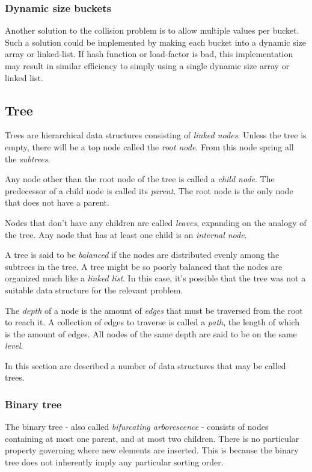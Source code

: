 \documentclass{article}
\begin{document}
\subsubsection{Dynamic size buckets}
Another solution to the collision problem is to allow multiple values per bucket. Such a solution could be
implemented by making each bucket into a dynamic size array or linked-list. If hash function or load-factor is bad,
this implementation may result in similar efficiency to simply using a single dynamic size array or linked list.


\newpage


\subsection{Tree}
Trees are hierarchical data structures consisting of {\em linked nodes}.
Unless the tree is empty, there will be a top node called the {\em root node}.
From this node spring all the {\em subtrees}.

Any node other than the root node of the tree is called a {\em child node}.
The predecessor of a child node is called its {\em parent}.
The root node is the only node that does not have a parent.

Nodes that don't have any children are called {\em leaves}, expanding on the analogy of the tree.
Any node that has at least one child is an {\em internal node}.

A tree is said to be {\em balanced} if the nodes are distributed evenly among the subtrees in the tree.
A tree might be so poorly balanced that the nodes are organized much like a {\em linked list}.
In this case, it's possible that the tree was not a suitable data structure for the relevant problem.

The {\em depth} of a node is the amount of {\em edges} that must be traversed from the root to reach it.
A collection of edges to traverse is called a {\em path}, the length of which is the amount of edges.
All nodes of the same depth are said to be on the same {\em level}.

In this section are described a number of data structures that may be called trees.


\subsubsection{Binary tree}
The binary tree - also called {\em bifurcating arborescence} - consists of nodes containing at most one parent,
and at most two children. There is no particular property governing where new elements are inserted.
This is because the binary tree does not inherently imply any particular sorting order.
\end{document}
